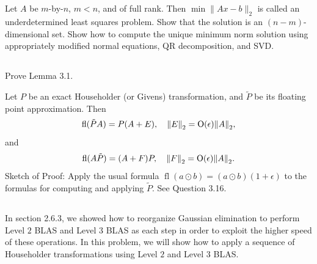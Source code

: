 \documentclass[a4paper]{ctexart}
\DeclareMathOperator{\fl}{\text{fl}}
\DeclareMathOperator{\Order}{\text{O}}
\newcommand{\pf}{\textbf{\color{pink}{proof:}}}
\begin{document}
\pf

\subsection{}
Let $A$ be $m$-by-$n$, $m<n$, and of full rank. Then
$\min \|Ax - b\|_2$ is called an underdetermined least squares problem. Show that
the solution is an $(n - m)$-dimensional set. Show how to compute the unique
minimum norm solution using appropriately modified normal equations, QR
decomposition, and SVD.

\pf

\subsection{}
Prove Lemma 3.1.

Let $P$ be an exact Householder (or Givens) transformation, and $\tilde{P}$ be its floating point approximation.  Then
\begin{equation*}
    \fl(\tilde{P}A) = P(A+E),\quad \norm{E}_2 = \Order(\epsilon)\norm{A}_2,
\end{equation*}
and
\begin{equation*}
    \fl(A\tilde{P}) = (A+F)P,\quad \norm{F}_2 = \Order(\epsilon)\norm{A}_2.
\end{equation*}
Sketch  of  Proof: Apply  the usual  formula $\fl(a\odot b)=(a\odot b)(1 +\epsilon)$ to the formulas for computing and applying $\tilde{P}$.  See Question 3.16.

\pf

\subsection{}
In section 2.6.3, we showed how to reorganize Gaussian
 elimination to perform Level $2$ BLAS and Level $3$ BLAS as each step in
order to exploit the higher speed of these operations. In this problem, we will
show how to apply a sequence of Householder transformations using Level $2$
and Level $3$ BLAS.
\end{document}
